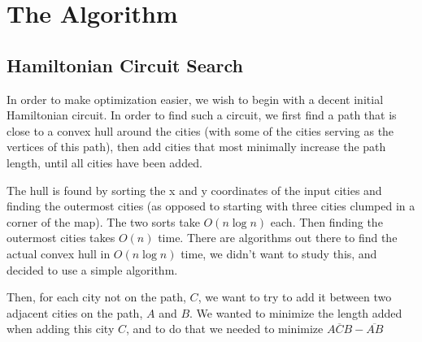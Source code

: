 \documentclass[letterpaper,11pt]{article}
\begin{document}

	\section{The Algorithm}
		\subsection{Hamiltonian Circuit Search}
			In order to make optimization easier, we wish to begin with
			a decent initial Hamiltonian circuit. In order to find such
			a circuit, we first find a path that is close to a convex hull
			around the cities (with some of the cities serving as the vertices
			of this path), then add cities that most minimally increase the
			path length, until all cities have been added.

			The hull is found by sorting the x and y coordinates of the input
			cities and finding the outermost cities (as opposed to starting
			with three cities clumped in a corner of the map). The two sorts
			take $O(n \log n)$ each. Then finding the outermost cities takes
			$O(n)$ time. There are algorithms out there to find the actual
			convex hull in $O(n \log n)$ time, we didn't want to study this,
			and decided to use a simple algorithm.

			Then, for each city not on the path, $C$, we want to try to add it
			between two adjacent cities on the path, $A$ and $B$. We wanted to
			minimize the length added when adding this city $C$, and to do that
			we needed to minimize $\overline{ACB} - \overline{AB}$
\end{document}
